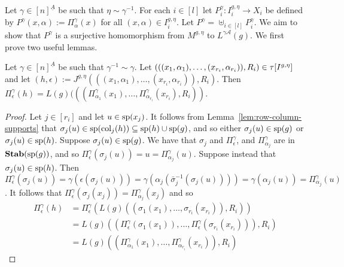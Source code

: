 \documentclass[../main/thesis.tex]{subfiles}
\begin{document}
Let $\gamma \in [n]^{\underline{A}}$ be such that $\eta \sim \gamma^{-1}$. For
each $i \in [l]$ let $P^{\gamma}_i: I^{g, \eta}_i \rightarrow X_i$ be defined by
$P^{\gamma} (x, \alpha) := \Pi^{\gamma}_{\alpha}(x)$ for all $(x, \alpha) \in
I^{g, \eta}_i$. Let $P^{\gamma} = \uplus_{i \in [l]} P^{\gamma}_i$. We aim to
show that $P^{\gamma}$ is a surjective homomorphism from $M^{g, \eta}$ to
$L^{\gamma \mathcal{A}}(g)$. We first prove two useful lemmas.
\begin{lem}
  Let $\gamma \in [n]^{\underline{A}}$ be such that $\gamma^{-1} \sim \gamma$.
  Let $(((x_1, \alpha_1), \ldots, (x_{r_i}, \alpha_{r_i})), R_i) \in
  \tau[I^{g, \eta}]$ and let $(h, \epsilon) := J^{g, \eta}(((x_1,
  \alpha_1), \ldots, (x_{r_i}, \alpha_{r_i})), R_i)$. Then
  $\Pi^{\gamma}_{\epsilon} (h) = L(g)(((\Pi^{\gamma}_{\alpha_1} (x_1), \ldots,
  \Pi^{\gamma}_{\alpha_{r_i}}(x_{r_i}), R_i))$.
  \label{lem:defining-h-from-index}
\end{lem}
\begin{proof}
  Let $j \in [r_i]$ and let $u \in \text{sp}(x_{j})$. It follows from
  Lemma~\ref{lem:row-column-supports} that $\sigma_j(u) \in \text{sp}(\text{\upshape col}_{j}(h))
  \subseteq \text{sp}(h) \cup \text{sp}(g)$, and so either $\sigma_j (u) \in
  \text{sp}(g)$ or $\sigma_j (u) \in \text{sp}(h)$. Suppose $\sigma_j (u) \in
  \text{sp}(g)$. We have that $\sigma_j$ and $\Pi^{\gamma}_{\epsilon}$, and
  $\Pi^{\gamma}_{\alpha_j}$ are in $\text{\textbf{Stab}} (\text{sp} (g))$, and so $\Pi^{\gamma}_{\epsilon}
  (\sigma_j (u)) = u = \Pi^{\gamma}_{\alpha_j}(u)$. Suppose instead that
  $\sigma_j(u) \in \text{sp}(h)$. Then $\Pi^{\gamma}_{\epsilon}(\sigma_j (u)) =
  \gamma (\epsilon (\sigma_j(u))) = \gamma (\alpha_j (\bar{\sigma}^{-1}_j
  (\sigma_j (u)))) = \gamma(\alpha_j (u)) = \Pi^{\gamma}_{\alpha_j} (u)$. It
  follows that $\Pi^{\gamma}_{\epsilon} (\sigma_j(x_j)) =
  \Pi^{\gamma}_{\alpha_j}(x_j)$ and so
  \begin{align*}
    \Pi^{\gamma}_{\epsilon} (h) &= \Pi^{\gamma}_{\epsilon} (L(g)((\sigma_1 (x_1), \ldots, \sigma_{r_i}(x_{r_i})), R_i)) \\ &= L(g)((\Pi^{\gamma}_{\epsilon}(\sigma_1 (x_1)), \ldots,\Pi^{\gamma}_{\epsilon}(\sigma_{r_i}(x_{r_i}))), R_i) \\ &= L(g)((\Pi^{\gamma}_{\alpha_1}(x_1), \ldots,\Pi^{\gamma}_{\alpha_{r_i}}(x_{r_i})), R_i)
  \end{align*}
\end{proof}

\end{document}
